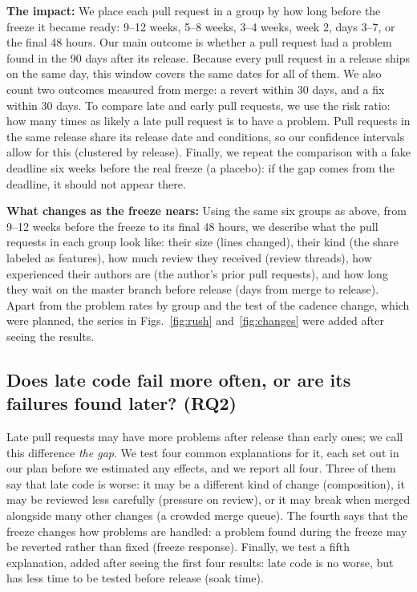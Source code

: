 \documentclass[10pt,conference]{IEEEtran}
\begin{document}
\textbf{The impact:} We place each pull request in a group by how long before the freeze it became ready: 9--12 weeks, 5--8 weeks, 3--4 weeks, week 2, days 3--7, or the final 48 hours. Our main outcome is whether a pull request had a problem found in the 90 days after its release. Because every pull request in a release ships on the same day, this window covers the same dates for all of them. We also count two outcomes measured from merge: a revert within 30 days, and a fix within 30 days. To compare late and early pull requests, we use the risk ratio: how many times as likely a late pull request is to have a problem. Pull requests in the same release share its release date and conditions, so our confidence intervals allow for this (clustered by release). Finally, we repeat the comparison with a fake deadline six weeks before the real freeze (a placebo): if the gap comes from the deadline, it should not appear there.

\textbf{What changes as the freeze nears:} Using the same six groups as above, from 9--12 weeks before the freeze to its final 48 hours, we describe what the pull requests in each group look like: their size (lines changed), their kind (the share labeled as features), how much review they received (review threads), how experienced their authors are (the author's prior pull requests), and how long they wait on the master branch before release (days from merge to release). Apart from the problem rates by group and the test of the cadence change, which were planned, the series in Figs.~\ref{fig:rush} and~\ref{fig:changes} were added after seeing the results.

\subsection{Does late code fail more often, or are its failures found later? (RQ2)}
Late pull requests may have more problems after release than early ones; we call this difference \emph{the gap}. We test four common explanations for it, each set out in our plan before we estimated any effects, and we report all four. Three of them say that late code is worse: it may be a different kind of change (composition), it may be reviewed less carefully (pressure on review), or it may break when merged alongside many other changes (a crowded merge queue). The fourth says that the freeze changes how problems are handled: a problem found during the freeze may be reverted rather than fixed (freeze response). Finally, we test a fifth explanation, added after seeing the first four results: late code is no worse, but has less time to be tested before release (soak time).
\end{document}
